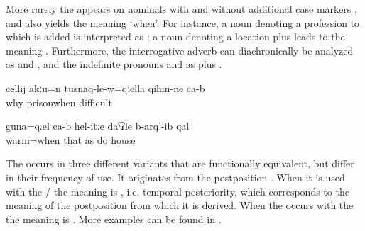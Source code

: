 More rarely the  appears on nominals with and without additional case markers , and also yields the meaning `when'. For instance, a noun denoting a profession to which  is added is interpreted as ; a noun denoting a location plus  leads to the meaning  . Furthermore, the interrogative adverb   can diachronically be analyzed as   and , and the indefinite pronouns  and   as   plus . 
%

\begin{exe}

	\ex	\label{ex:‎Because when (you are) in prison it is difficult}
	\gll	cellij	akːu=n	tusnaq-le-w=qːella	qihin-ne	ca-b\\
		why		prisonwhen	difficult	\\
	\glt	{}

	\ex	\label{ex:‎When it is warm (i.e. in warm places) the houses are built like thisMorph}
	\gll	guna=qːel	ca-b	hel-itːe	daˁʡle	b-arq'-ib	qal\\
		warm=when		that	as	do	house	\\
	\glt	{}
\end{exe} 


The   occurs in three different variants that are functionally equivalent, but differ in their frequency of use. It originates from the postposition  . When it is used with the / the meaning is  , i.e. temporal posteriority, which corresponds to the meaning of the postposition from which it is derived. When the  occurs with the  the meaning is  . More examples can be found in .

